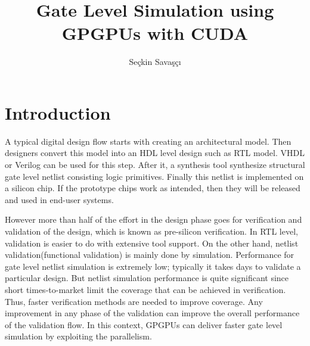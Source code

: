 \documentclass[a4paper,onesided,12pt]{report}
\title{Gate Level Simulation using GPGPUs with CUDA}
\author{Seçkin Savaşçı}
\begin{document}
\makebstitle %
\makeapprovalpage

\tableofcontents
\newpage








\chapter{Introduction}
\label{chapter:Introduction}
 A typical digital design flow starts with creating an architectural model. Then designers convert this model into an HDL level design such as RTL model. VHDL or Verilog can be used for this step. After it, a synthesis tool synthesize structural gate level netlist consisting logic primitives. Finally this netlist is implemented on a silicon chip. If the prototype chips work as intended, then they will be released and used in end-user systems.
 
  
 However more than half of the effort in the design phase goes for verification and validation of the design, which is known as pre-silicon verification. In RTL level, validation is easier to do with extensive tool support. On the other hand, netlist validation(functional validation) is mainly done by simulation. Performance for gate level netlist simulation is extremely low; typically it takes days to validate a particular design. But netlist simulation performance is quite significant since short times-to-market limit the coverage that can be achieved in verification. Thus, faster verification methods are needed to improve coverage. Any improvement in any phase of the validation can improve the overall performance of the validation flow. In this context, GPGPUs can deliver faster gate level simulation by exploiting the parallelism. 
 
\end{document}
